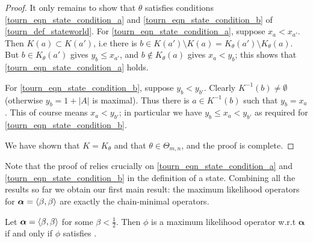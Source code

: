 \begin{proof}
    It only remains to show that $\theta$ satisfies conditions
    \cref{tourn_eqn_state_condition_a} and \cref{tourn_eqn_state_condition_b} of
    \cref{tourn_def_stateworld}. For \cref{tourn_eqn_state_condition_a}, suppose $x_a
    < x_{a'}$. Then $K(a) \subset K(a')$, i.e there is $b \in K(a') \setminus
    K(a) = K_\theta(a') \setminus K_\theta(a)$. But $b \in K_\theta(a')$ gives
    $y_b \le x_{a'}$, and $b \not\in K_\theta(a)$ gives $x_a < y_b$; this shows
    that \cref{tourn_eqn_state_condition_a} holds.

    For \cref{tourn_eqn_state_condition_b}, suppose $y_b < y_{b'}$. Clearly
    $K^{-1}(b) \ne \emptyset$ (otherwise $y_b = 1 + |A|$ is maximal). Thus
    there is $a \in K^{-1}(b)$ such that $y_b = x_a$. This of course means $x_a
    < y_{b'}$; in particular we have $y_b \le x_a < y_{b'}$ as required for
    \cref{tourn_eqn_state_condition_b}.

    We have shown that $K = K_\theta$ and that $\theta \in \Theta_{m,n}$, and the
    proof is complete.
\end{proof}

Note that the proof of  relies crucially on
\cref{tourn_eqn_state_condition_a} and
\cref{tourn_eqn_state_condition_b} in the definition of a state. Combining
all the results so far we obtain our first main result: the maximum likelihood
operators for $\bm{\alpha} = \langle {\beta,\beta} \rangle$ are exactly the chain-minimal
operators.

\begin{theorem}
   \label{tourn_result_mle_iff_chainmin_operator}
   Let $\bm{\alpha} = \langle {\beta, \beta} \rangle$ for some $\beta < \frac{1}{2}$.
   Then $\phi$ is a maximum likelihood operator w.r.t $\bm{\alpha}$
    if and only if $\phi$ satisfies \chainmin{}.
\end{theorem}

